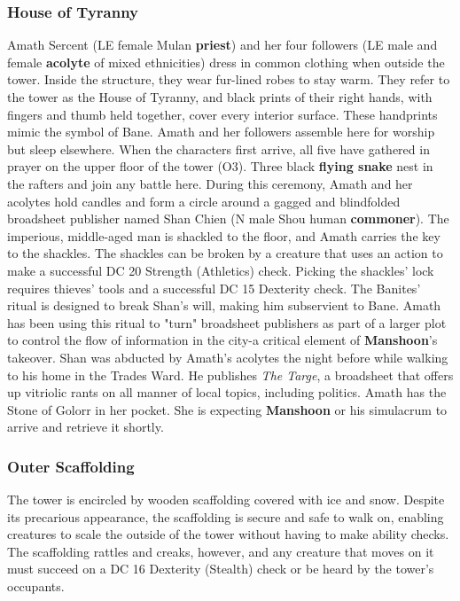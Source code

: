\documentclass[10pt,a4paper,twoside,twocolumn,openany,nodeprecatedcode]{dndbook}
\begin{document}
\subsubsection{House of Tyranny}
Amath Sercent (LE female Mulan \textbf{priest}) and her four followers (LE male and female \textbf{acolyte} of mixed ethnicities) dress in common clothing when outside the tower. Inside the structure, they wear fur-lined robes to stay warm. They refer to the tower as the House of Tyranny, and black prints of their right hands, with fingers and thumb held together, cover every interior surface. These handprints mimic the symbol of Bane.
Amath and her followers assemble here for worship but sleep elsewhere. When the characters first arrive, all five have gathered in prayer on the upper floor of the tower (O3). Three black \textbf{flying snake} nest in the rafters and join any battle here. During this ceremony, Amath and her acolytes hold candles and form a circle around a gagged and blindfolded broadsheet publisher named Shan Chien (N male Shou human \textbf{commoner}). The imperious, middle-aged man is shackled to the floor, and Amath carries the key to the shackles. The shackles can be broken by a creature that uses an action to make a successful DC 20 Strength (Athletics) check. Picking the shackles' lock requires thieves' tools and a successful DC 15 Dexterity check.
The Banites' ritual is designed to break Shan's will, making him subservient to Bane. Amath has been using this ritual to "turn" broadsheet publishers as part of a larger plot to control the flow of information in the city-a critical element of \textbf{Manshoon}'s takeover. Shan was abducted by Amath's acolytes the night before while walking to his home in the Trades Ward. He publishes \textit{The Targe}, a broadsheet that offers up vitriolic rants on all manner of local topics, including politics.
Amath has the Stone of Golorr in her pocket. She is expecting \textbf{Manshoon} or his simulacrum to arrive and retrieve it shortly.
\subsubsection{Outer Scaffolding}
The tower is encircled by wooden scaffolding covered with ice and snow. Despite its precarious appearance, the scaffolding is secure and safe to walk on, enabling creatures to scale the outside of the tower without having to make ability checks. The scaffolding rattles and creaks, however, and any creature that moves on it must succeed on a DC 16 Dexterity (Stealth) check or be heard by the tower's occupants.
\end{document}
